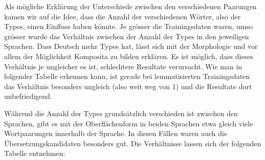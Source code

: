 \documentclass[11pt,twoside,openright]{mpreport}
\begin{document}
Als mögliche Erklärung der Unterschiede zwischen den verschiedenen Paarungen kamen wir auf die Idee, dass die Anzahl der verschiedenen Wörter, also der Types, einen Einfluss haben könnte. Je grösser die Trainingsdaten waren, umso grösser wurde das Verhältnis zwischen der Anzahl der Types in den jeweiligen Sprachen. Dass Deutsch mehr Types hat, lässt sich mit der Morphologie und vor allem der Möglichkeit Komposita zu bilden erklären. Es ist möglich, dass dieses Verhältnis je ungleicher es ist, schlechtere Resultate verursacht. Wie man in folgender Tabelle erkennen kann, ist gerade bei lemmatisierten Trainingsdaten das Verhältnis besonders ungleich (also weit weg von 1) und die Resultate dort unbefriedigend.

\hspace{-6cm}

Während die Anzahl der Types grundsätzlich verschieden ist zwischen den Sprachen, gibt es mit der Oberflächenform in beiden Sprachen etwa gleich viele Wortpaarungen innerhalb der Sprache. In diesen Fällen waren auch die Übersetzungskandidaten besonders gut. Die Verhältnisse lassen sich der folgenden Tabelle entnehmen:
\end{document}
